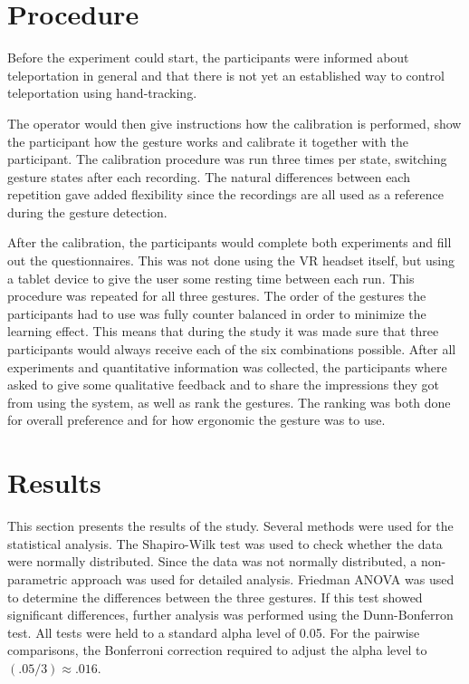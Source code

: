 \section{Procedure}
Before the experiment could start, the participants were informed about teleportation in general and that there is not yet an established way to control teleportation using hand-tracking.

The operator would then give instructions how the calibration is performed, show the participant how the gesture works and calibrate it together with the participant. The calibration procedure was run three times per state, switching gesture states after each recording. The natural differences between each repetition gave added flexibility since the recordings are all used as a reference during the gesture detection.

After the calibration, the participants would complete both experiments and fill out the questionnaires. This was not done using the VR headset itself, but using a tablet device to give the user some resting time between each run. This procedure was repeated for all three gestures. 
The order of the gestures the participants had to use was fully counter balanced in order to minimize the learning effect. This means that during the study it was made sure that three participants would always receive each of the six combinations possible. 
After all experiments and quantitative information was collected, the participants where asked to give some qualitative feedback and to share the impressions they got from using the system, as well as rank the gestures. The ranking was both done for overall preference and for how ergonomic the gesture was to use.   


\section{Results}
This section presents the results of the study. Several methods were used for the statistical analysis. The Shapiro-Wilk test was used to check whether the data were normally distributed. Since the data was not normally distributed, a non-parametric approach was used for detailed analysis. Friedman ANOVA was used to determine the differences between the three gestures. If this test showed significant differences, further analysis was performed using the Dunn-Bonferron test. All tests were held to a standard alpha level of 0.05. For the
pairwise comparisons, the Bonferroni correction required to adjust the alpha level to $(.05/3) \approx .016$.

